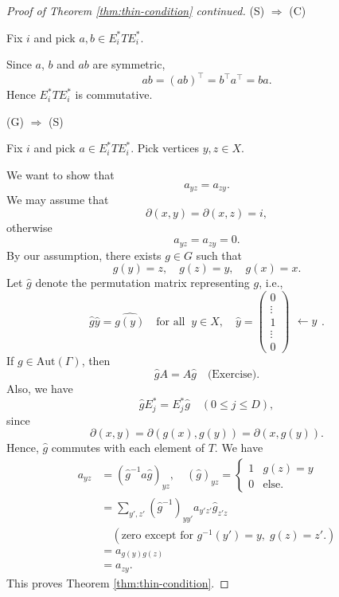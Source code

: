 \documentclass[
]{book}
\theoremstyle{definition}
\theoremstyle{definition}
\theoremstyle{definition}
\theoremstyle{definition}
\theoremstyle{remark}
\begin{document}
\begin{proof}[Proof of Theorem \ref{thm:thin-condition} continued]
\leavevmode

(S) \(\Rightarrow\) (C)

Fix \(i\) and pick \(a, b\in E_i^*TE_i^*\).

Since \(a\), \(b\) and \(ab\) are symmetric,
\[ab = (ab)^\top = b^\top a^\top = ba.\]
Hence \(E_i^*TE_i^*\) is commutative.

(G) \(\Rightarrow\) (S)

Fix \(i\) and pick \(a \in E_i^*TE_i^*\). Pick vertices \(y, z\in X\).

We want to show that
\[a_{yz} = a_{zy}.\]
We may assume that
\[\partial(x, y) = \partial(x,z) = i,\]
otherwise
\[a_{yz} = a_{zy} = 0.\]
By our assumption, there exists \(g\in G\) such that
\[g(y) = z, \quad g(z) = y, \quad g(x) = x.\]
Let \(\hat{g}\) denote the permutation matrix representing \(g\), i.e.,
\[\hat{g}\hat{y} =\widehat{g(y)} \quad \text{for all }\ y\in X, \quad \hat{y} = \begin{pmatrix}0\\\vdots \\ 1 \\\vdots \\0\end{pmatrix}\begin{matrix} \\ \\ \leftarrow y \\ \\ \text{ } \end{matrix}.\]
If \(g\in \mathrm{Aut}(\Gamma)\), then
\[\hat{g}A = A\hat{g} \quad \text{(Exercise)}.\]
Also, we have
\[\hat{g}E_j^* = E^*_j\hat{g} \quad (0\leq j\leq D),\]
since
\[\partial(x,y) = \partial(g(x), g(y)) = \partial(x, g(y)).\]
Hence, \(\hat{g}\) commutes with each element of \(T\). We have
\begin{align}
a_{yz} & = (\hat{g}^{-1}a\hat{g})_{yz}, \quad (\hat{g})_{yz} = \begin{cases} 1 & g(z) = y\\ 0 & \text{else.}\end{cases}\\
& = \sum_{y', z'}(\hat{g}^{-1})_{yy'}a_{y'z'}\hat{g}_{z'z}\\
& \quad (\text{zero except for $g^{-1}(y') = y, \; g(z) = z'$}.)\\
& = a_{g(y)g(z)}\\
& = a_{zy}.
\end{align}
This proves Theorem \ref{thm:thin-condition}.

\end{proof}
\end{document}
